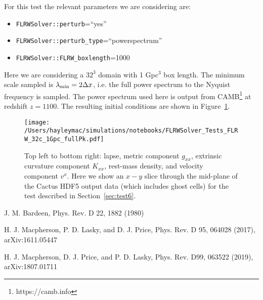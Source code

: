 For this test the relevant parameters we are considering are:

\begin{itemize}
	\item \texttt{FLRWSolver::perturb}=``yes''
	\item \texttt{FLRWSolver::perturb\_type}=``powerspectrum''
	\item \texttt{FLRWSolver::FLRW\_boxlength}=1000
\end{itemize}
Here we are considering a $32^3$ domain with 1 Gpc$^3$ box length. The minimum scale sampled is $\lambda_{\rm min} = 2 \Delta x$, i.e. the full power spectrum to the Nyquist frequency is sampled. The power spectrum used here is output from CAMB\footnote{https://camb.info} at redshift $z=1100$. The resulting initial conditions are shown in Figure~\ref{fig:test6}.

\begin{figure}[ht]
	\begin{center}
	   \texttt{[image: /Users/hayleymac/simulations/notebooks/FLRWSolver\_Tests\_FLRW\_32c\_1Gpc\_fullPk.pdf]}
	\end{center}
	\caption{Top left to bottom right: lapse, metric component $g_{xx}$, extrinsic curvature component $K_{xx}$, rest-mass density, and velocity component $v^x$. Here we show an $x-y$ slice through the mid-plane of the Cactus HDF5 output data (which includes ghost cells) for the test described in Section~\ref{sec:test6}.}
	\label{fig:test6}
\end{figure}



\begin{thebibliography}{9}

 J. M. Bardeen, Phys. Rev. D 22, 1882 (1980)

 H. J. Macpherson, P. D. Lasky, and D. J. Price, Phys. Rev. D 95, 064028 (2017), arXiv:1611.05447

 H. J. Macpherson, D. J. Price, and P. D. Lasky, Phys. Rev. D99, 063522 (2019), arXiv:1807.01711

\end{thebibliography}









